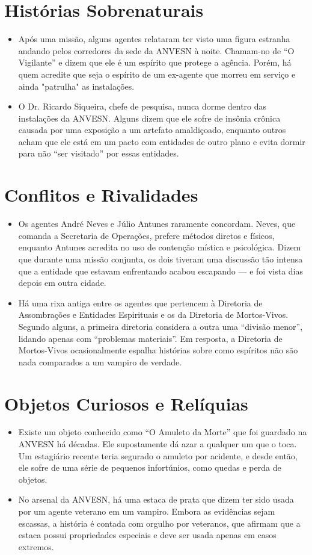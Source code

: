 \documentclass{book}
\begin{document}
\section{Histórias Sobrenaturais}
\begin{itemize}
    \item Após uma missão, alguns agentes relataram ter visto uma figura estranha andando pelos corredores da sede da ANVESN à noite. Chamam-no de “O Vigilante” e dizem que ele é um espírito que protege a agência. Porém, há quem acredite que seja o espírito de um ex-agente que morreu em serviço e ainda "patrulha" as instalações.
    \item O Dr. Ricardo Siqueira, chefe de pesquisa, nunca dorme dentro das instalações da ANVESN. Alguns dizem que ele sofre de insônia crônica causada por uma exposição a um artefato amaldiçoado, enquanto outros acham que ele está em um pacto com entidades de outro plano e evita dormir para não “ser visitado” por essas entidades.
\end{itemize}

\section{Conflitos e Rivalidades}
\begin{itemize}
    \item Os agentes André Neves e Júlio Antunes raramente concordam. Neves, que comanda a Secretaria de Operações, prefere métodos diretos e físicos, enquanto Antunes acredita no uso de contenção mística e psicológica. Dizem que durante uma missão conjunta, os dois tiveram uma discussão tão intensa que a entidade que estavam enfrentando acabou escapando — e foi vista dias depois em outra cidade.
    \item Há uma rixa antiga entre os agentes que pertencem à Diretoria de Assombrações e Entidades Espirituais e os da Diretoria de Mortos-Vivos. Segundo alguns, a primeira diretoria considera a outra uma “divisão menor”, lidando apenas com “problemas materiais”. Em resposta, a Diretoria de Mortos-Vivos ocasionalmente espalha histórias sobre como espíritos não são nada comparados a um vampiro de verdade.
\end{itemize}

\section{Objetos Curiosos e Relíquias}
\begin{itemize}
    \item Existe um objeto conhecido como “O Amuleto da Morte” que foi guardado na ANVESN há décadas. Ele supostamente dá azar a qualquer um que o toca. Um estagiário recente teria segurado o amuleto por acidente, e desde então, ele sofre de uma série de pequenos infortúnios, como quedas e perda de objetos.
    \item No arsenal da ANVESN, há uma estaca de prata que dizem ter sido usada por um agente veterano em um vampiro. Embora as evidências sejam escassas, a história é contada com orgulho por veteranos, que afirmam que a estaca possui propriedades especiais e deve ser usada apenas em casos extremos.
\end{itemize}
\end{document}
